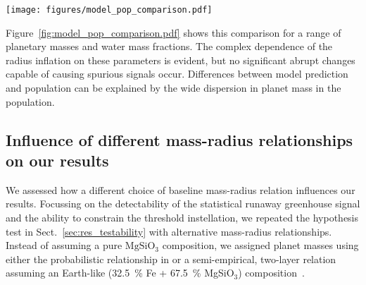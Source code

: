 \documentclass[twocolumn,twocolappendix,linenumbers]{aastex631}
\begin{document}
\begin{figure*}[ht!]
    \begin{centering}
        \texttt{[image: figures/model\_pop\_comparison.pdf]}
        \caption{
        Comparison of radius and bulk density changes predicted by the atmospheric models to the average changes measured in the synthetic planet population.
        Model predictions $\Delta R_\mathrm{model}$ and $\Delta \rho_\mathrm{model}$ depend on individual planet masses; $\langle \Delta R_\mathrm{population} \rangle$ and $\langle \Delta \rho_\mathrm{population} \rangle$ are averaged measurements of the overall population.
        Significant differences are thus expected.
        }
        \label{fig:model_pop_comparison.pdf}
    \end{centering}
\end{figure*}
Figure~\ref{fig:model_pop_comparison.pdf} shows this comparison for a range of planetary masses and water mass fractions.
The complex dependence of the radius inflation on these parameters is evident, but no significant abrupt changes capable of causing spurious signals occur.
Differences between model prediction and population can be explained by the wide dispersion in planet mass in the population.



\subsection{Influence of different mass-radius relationships on our results}\label{app:MR_relation}
We assessed how a different choice of baseline mass-radius relation influences our results.
Focussing on the detectability of the statistical runaway greenhouse signal and the ability to constrain the threshold instellation, we repeated the hypothesis test in Sect.~\ref{sec:res_testability} with alternative mass-radius relationships.
Instead of assuming a pure $\mathrm{MgSiO_3}$ composition, we assigned planet masses using either the probabilistic relationship in \citet{Wolfgang2016} or a semi-empirical, two-layer relation assuming an Earth-like (\SI{32.5}{\percent} Fe + \SI{67.5}{\percent} MgSiO$_3$) composition~\citep{Zeng2016}.
\end{document}
